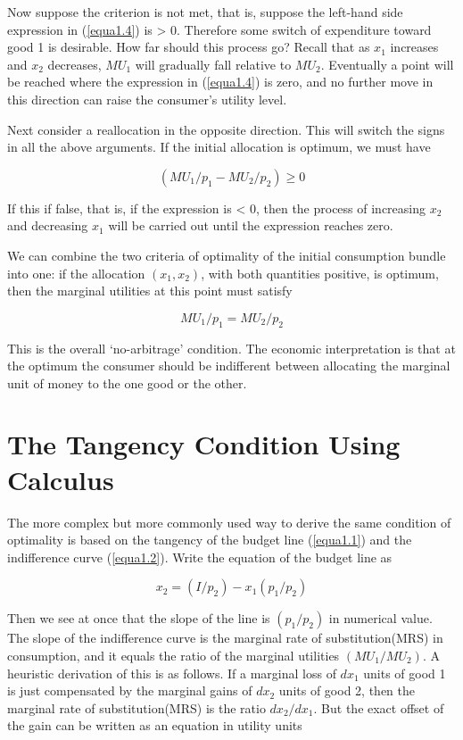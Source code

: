 Now suppose the criterion is not met, that is, suppose the left-hand side expression in (\ref{equa1.4}) is > 0. Therefore some switch of expenditure toward good 1 is desirable. How far should this process go? Recall that as $x_1$ increases and $x_2$ decreases, $MU_1$ will gradually fall relative to $MU_2$. Eventually a point will be reached where the expression in (\ref{equa1.4}) is zero, and no further move in this direction can raise the consumer's utility level.

Next consider a reallocation in the opposite direction. This will switch the signs in all the above arguments. If the initial allocation is optimum, we must have

\begin{equation}\label{equa1.5}
(MU_1 /p_1 - MU_2 /p_2) \geq 0
\end{equation} 

If this if false, that is, if the expression is < 0, then the process of increasing $x_2$ and decreasing $x_1$ will be carried out until the expression reaches zero.

We can combine the two criteria of optimality of the initial consumption bundle into one: if the allocation $(x_1, x_2)$, with both quantities positive, is optimum, then the marginal utilities at this point must satisfy

\begin{equation}\label{equa1.6}
MU_1 /p_1 = MU_2 /p_2
\end{equation} 

This is the overall `no-arbitrage' condition. The economic interpretation is that at the optimum the consumer should be indifferent between allocating the marginal unit of money to the one good or the other.

\section*{The Tangency Condition Using Calculus}

The more complex but more commonly used way to derive the same condition of optimality is based on the tangency of the budget line (\ref{equa1.1}) and the indifference curve (\ref{equa1.2}). Write the equation of the budget line as 

\begin{equation*}
x_2 = (I/p_2) - x_1 (p_1 / p_2)
\end{equation*} 

Then we see at once that the slope of the line is $(p_1 / p_2)$ in numerical value. The slope of the indifference curve is the marginal rate of substitution(MRS) in consumption, and it equals the ratio of the marginal utilities $(MU_1 / MU_2)$. A heuristic derivation of this is as follows. If a marginal loss of $dx_1$ units of good 1 is just compensated by the marginal gains of $dx_2$ units of good 2, then the marginal rate of substitution(MRS) is the ratio $dx_2 / dx_1$. But the exact offset of the gain can be written as an equation in utility units

